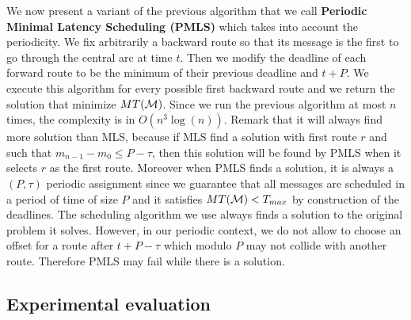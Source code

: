 \documentclass[a4paper,10pt]{article}
\begin{document}
     We now present a variant of the previous algorithm that we call {\bf Periodic Minimal Latency Scheduling (PMLS)}
     which takes into account the periodicity. We fix arbitrarily a backward route so that its message is the first to go through the central arc at time $t$. Then we modify the deadline of each forward route to be the minimum of their previous deadline and $t + P$.  We execute this algorithm for every possible first backward route and we return the solution that minimize $MT({\cal M})$. Since we run the previous algorithm at most $n$ times, the complexity is in $O(n^3\log(n))$. Remark that it will always find more solution than MLS,
     because if MLS find a solution with first route $r$ and such that $m_{n-1} - m_0 \leq P -\tau$, then this solution will be found by PMLS when it selects $r$ as the first route. Moreover when PMLS finds a solution, it is always a $(P,\tau)$ periodic assignment
     since we guarantee that all messages are scheduled in a period of time of size $P$ and it satisfies $MT({\cal M}) < T_{max}$ by construction of the deadlines. The scheduling algorithm we use always finds a solution to the  original problem it solves. However, in our periodic context, we do not allow to choose an offset for a route after $t+P- \tau$ which modulo $P$ may not collide with another route. Therefore PMLS may fail while there is a solution.
     
%   
%     
% 
%     
% 
% 
    
    \subsection{Experimental evaluation}
    \label{sec:resultsPALL}
    
\end{document}
